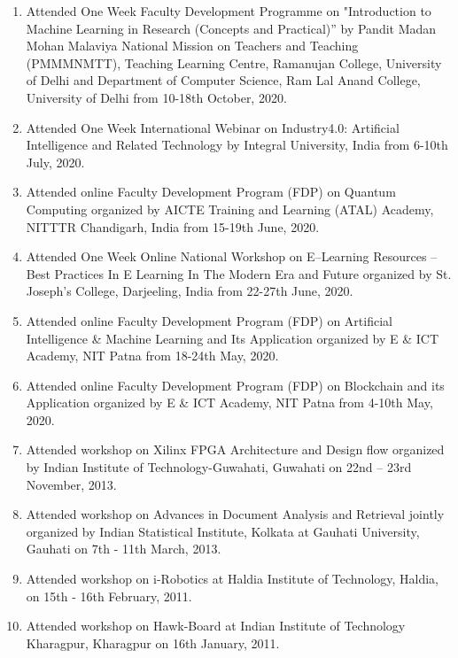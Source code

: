 \documentclass[11pt,a4paper]{moderncv}
\begin{document}
\begin{adjustwidth}{6em}{0pt}
\begin{enumerate}
		\item Attended One Week Faculty Development Programme on "Introduction to Machine Learning in Research (Concepts and Practical)” by Pandit Madan Mohan Malaviya National Mission on Teachers and Teaching (PMMMNMTT), Teaching Learning Centre, Ramanujan College, University of Delhi and Department of Computer Science, Ram Lal Anand College, University of Delhi from 10-18th October, 2020.
		
		\item Attended One Week International Webinar on Industry4.0: Artificial Intelligence and Related Technology by Integral University, India from 6-10th July, 2020.
		
		\item Attended online Faculty Development Program (FDP) on Quantum Computing organized by AICTE Training and Learning (ATAL) Academy, NITTTR Chandigarh, India from 15-19th June, 2020.
		
		\item Attended One Week Online National Workshop on E–Learning Resources – Best Practices In E Learning In The Modern Era and Future organized by St. Joseph’s College, Darjeeling, India from 22-27th June, 2020.
		
		\item Attended online Faculty Development Program (FDP) on Artificial Intelligence \& Machine Learning and Its Application organized by E \& ICT Academy, NIT Patna from 18-24th May, 2020.
		
		\item Attended online Faculty Development Program (FDP) on Blockchain and its Application organized by E \& ICT Academy, NIT Patna from 4-10th May, 2020.
		
		\item Attended workshop on Xilinx FPGA Architecture and Design flow organized by Indian Institute of Technology-Guwahati, Guwahati on 22nd – 23rd November, 2013.
		
		\item Attended workshop on Advances in Document Analysis and Retrieval jointly organized by Indian Statistical Institute, Kolkata at Gauhati University, Gauhati on 7th - 11th March, 2013.
		
		\item Attended workshop on i-Robotics at Haldia Institute of Technology, Haldia, on 15th - 16th February, 2011.
		
		\item Attended workshop on Hawk-Board at Indian Institute of Technology Kharagpur, Kharagpur on 16th January, 2011.
		

\end{enumerate}
\end{adjustwidth}
\end{document}
